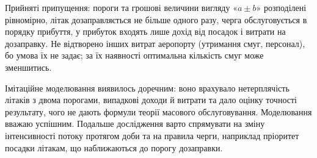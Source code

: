 Прийняті припущення: пороги та грошові величини вигляду «$a \pm b$» розподілені рівномірно, літак дозаправляється не більше одного разу, черга обслуговується в порядку прибуття, у прибуток входять лише дохід від посадок і витрати на дозаправку. Не відтворено інших витрат аеропорту (утримання смуг, персонал), бо умова їх не задає; за їх наявності оптимальна кількість смуг може зменшитись.

Імітаційне моделювання виявилось доречним: воно врахувало нетерплячість літаків з двома порогами, випадкові доходи й витрати та дало оцінку точності результату, чого не дають формули теорії масового обслуговування. Моделювання вважаю успішним. Подальше дослідження варто спрямувати на зміну інтенсивності потоку протягом доби та на правила черги, наприклад пріоритет посадки літакам, що наближаються до порогу дозаправки.
